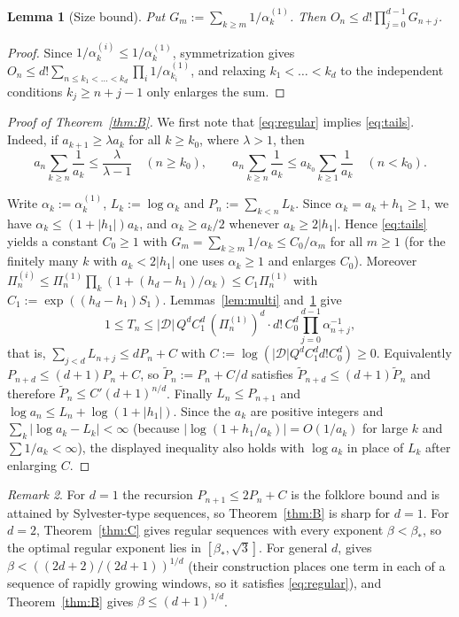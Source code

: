 \documentclass[11pt]{amsart}
\newtheorem{lemma}{Lemma}[section]
\theoremstyle{definition}
\theoremstyle{remark}
\newtheorem{remark}[lemma]{Remark}
\begin{document}
\begin{lemma}[Size bound]\label{lem:multisize}
Put $G_m:=\sum_{k\ge m}1/\alpha^{(1)}_k$. Then $O_n\le d!\prod_{j=0}^{d-1}G_{n+j}$.
\end{lemma}

\begin{proof}
Since $1/\alpha^{(i)}_k\le1/\alpha^{(1)}_k$, symmetrization gives
$O_n\le d!\sum_{n\le k_1<\dots<k_d}\prod_i 1/\alpha^{(1)}_{k_i}$, and relaxing
$k_1<\dots<k_d$ to the independent conditions $k_j\ge n+j-1$ only enlarges the sum.
\end{proof}

\begin{proof}[Proof of Theorem~\ref{thm:B}]
We first note that \eqref{eq:regular} implies \eqref{eq:tails}. Indeed, if
$a_{k+1}\ge\lambda a_k$ for all $k\ge k_0$, where $\lambda>1$, then
\[
a_n\sum_{k\ge n}\frac1{a_k}\le\frac{\lambda}{\lambda-1}\quad(n\ge k_0),\qquad
a_n\sum_{k\ge n}\frac1{a_k}\le a_{k_0}\sum_{k\ge1}\frac1{a_k}\quad(n<k_0).
\]

Write $\alpha_k:=\alpha^{(1)}_k$, $L_k:=\log\alpha_k$ and $P_n:=\sum_{k<n}L_k$. Since
$\alpha_k=a_k+h_1\ge1$, we have $\alpha_k\le(1+|h_1|)a_k$, and $\alpha_k\ge a_k/2$
whenever $a_k\ge2|h_1|$. Hence \eqref{eq:tails} yields a constant $C_0\ge1$ with
$G_m=\sum_{k\ge m}1/\alpha_k\le C_0/\alpha_m$ for all $m\ge1$ (for the finitely many
$k$ with $a_k<2|h_1|$ one uses $\alpha_k\ge1$ and enlarges $C_0$).
Moreover $\Pi^{(i)}_n\le\Pi^{(1)}_n\prod_k(1+(h_d-h_1)/\alpha_k)\le C_1\Pi^{(1)}_n$ with
$C_1:=\exp((h_d-h_1)S_1)$. Lemmas~\ref{lem:multi} and~\ref{lem:multisize} give
\[
1\le T_n\le |\mathcal D|\,Q^dC_1^d\,(\Pi^{(1)}_n)^d\cdot d!\,C_0^d\prod_{j=0}^{d-1}\alpha_{n+j}^{-1},
\]
that is, $\sum_{j<d}L_{n+j}\le dP_n+C$ with
$C:=\log(|\mathcal D|Q^dC_1^dd!C_0^d)\ge0$. Equivalently $P_{n+d}\le(d+1)P_n+C$, so
$\tilde P_n:=P_n+C/d$ satisfies $\tilde P_{n+d}\le(d+1)\tilde P_n$ and therefore
$\tilde P_n\le C'(d+1)^{n/d}$. Finally $L_n\le P_{n+1}$ and
$\log a_n\le L_n+\log(1+|h_1|)$. Since the $a_k$ are positive integers and
$\sum_k|\log a_k-L_k|<\infty$ (because $|\log(1+h_1/a_k)|=O(1/a_k)$ for large $k$ and
$\sum1/a_k<\infty$), the displayed inequality also holds with $\log a_k$ in place of
$L_k$ after enlarging $C$.
\end{proof}

\begin{remark}\label{rem:Bsharp}
For $d=1$ the recursion $P_{n+1}\le2P_n+C$ is the folklore bound and is attained by
Sylvester-type sequences, so Theorem~\ref{thm:B} is sharp for $d=1$. For $d=2$,
Theorem~\ref{thm:C} gives regular sequences with every exponent $\beta<\beta_*$, so the
optimal regular exponent lies in $[\beta_*,\sqrt3]$. For general $d$, \cite{KT25} gives
$\beta<((2d+2)/(2d+1))^{1/d}$ (their construction places one term in each of a sequence
of rapidly growing windows, so it satisfies \eqref{eq:regular}), and
Theorem~\ref{thm:B} gives $\beta\le(d+1)^{1/d}$.
\end{remark}
\end{document}
